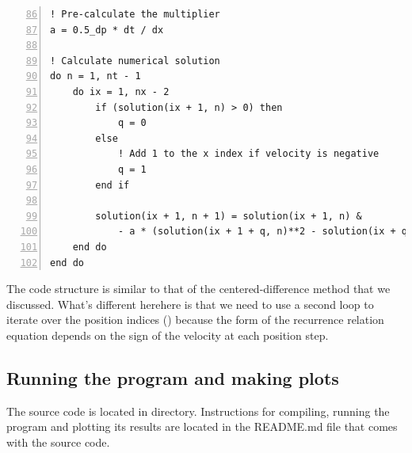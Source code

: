 \noindent\begin{minipage}{\linewidth}
\begin{lstlisting}[caption={Implementation of the upwind method of solving advection equation (\code{advection\_equation.f90}).},frame=tlrb,label={code_upwind}, numbers=left, firstnumber=86]
! Pre-calculate the multiplier
a = 0.5_dp * dt / dx

! Calculate numerical solution
do n = 1, nt - 1
    do ix = 1, nx - 2
        if (solution(ix + 1, n) > 0) then
            q = 0
        else
            ! Add 1 to the x index if velocity is negative
            q = 1
        end if

        solution(ix + 1, n + 1) = solution(ix + 1, n) &
            - a * (solution(ix + 1 + q, n)**2 - solution(ix + q, n)**2)
    end do
end do
\end{lstlisting}
\end{minipage}

The code structure is similar to that of the centered-difference method that we discussed. What's different herehere is that we need to use a second loop to iterate over the position indices () because the form of the recurrence relation equation depends on the sign of the velocity at each position step.

\subsection{Running the program and making plots}

The source code is located in  directory. Instructions for compiling, running the program and plotting its results are located in the README.md file that comes with the source code.